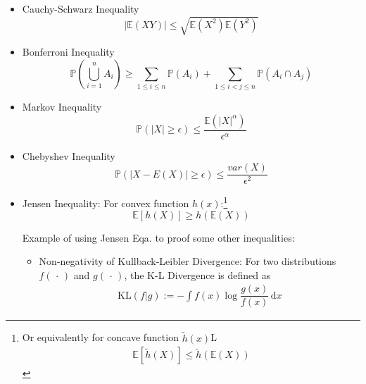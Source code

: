 \begin{itemize}
    \item Cauchy-Schwarz Inequality
    \begin{equation}
        \left\vert \mathbb{E}(XY) \right\vert\leq \sqrt{\mathbb{E}(X^2)\mathbb{E}(Y^2)}
    \end{equation}

    \item Bonferroni Inequality
\begin{equation}    \mathbb{P}(\bigcup_{i=1}^n A_i)\geq \sum_{1\leq i\leq n}  \mathbb{P}(A_i)+\sum_{1\leq i <j\leq n}  \mathbb{P}(A_i\cap A_j)
\end{equation}
    \item Markov Inequality
\begin{equation}     \mathbb{P}(|X|\geq \epsilon)\leq\frac{\mathbb{E}(|X|^\alpha)}{\epsilon^\alpha}
\end{equation}

    \item Chebyshev Inequality
\begin{equation}     \mathbb{P}(|X-E(X)|\geq\epsilon)\leq\frac{var(X)}{\epsilon^2}
\end{equation}
    \item Jensen Inequality: For convex function $h(x)$:\footnote{Or equivalently for concave function $ \tilde{h}(x) $L
    \begin{align}
         \mathbb{E}[\tilde{h}(X)]\leq \tilde{h}(\mathbb{E}(X))
    \end{align}
    }
\begin{equation}    \mathbb{E}[h(X)]\geq h(\mathbb{E}(X))
\end{equation}
    
    Example of using Jensen Eqa. to proof some other inequalities:
    \begin{itemize}[topsep=2pt,itemsep=0pt]
        \item Non-negativity of Kullback-Leibler Divergence: For two distributions $ f(\, \cdot \, ) $ and $ g(\, \cdot \, ) $, the K-L Divergence is defined as 
        \begin{align}
            \mathrm{KL}(f|g):=-\int f(x)\log \dfrac{g(x)}{f(x)}  \,\mathrm{d}x
        \end{align}
        

\end{itemize}
\end{itemize}

